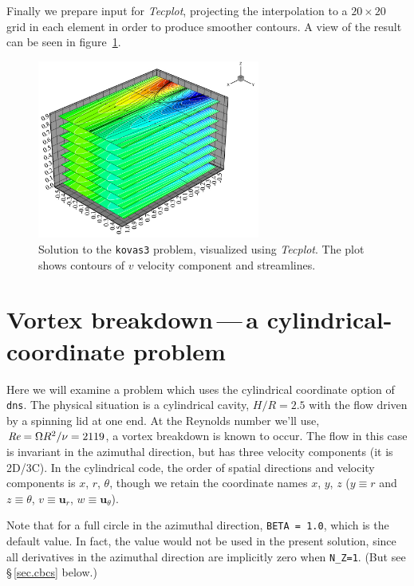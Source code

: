 \documentclass[11pt]{report}
\def\Rey{\mbox{\it Re}}                             %
\newcommand{\Tecplot}{\emph{Tecplot}}
\begin{document}
Finally we prepare input for \Tecplot, projecting the
interpolation to a $20\times20$ grid in each element in order to
produce smoother contours.  A view of the result can be seen in
figure~\ref{kov3soln}.
\begin{figure}
\begin{center}
\includegraphics[width=0.65\textwidth]{kovas3_bitmap}
\end{center}
\caption{
\label{kov3soln}
  Solution to the \texttt{kovas3} problem, visualized using
  \Tecplot.  The plot shows contours of $v$ velocity component
  and streamlines.  }
\end{figure}

\section{Vortex breakdown\,---\,a cylindrical-coordinate problem}
\label{sec.vb}

Here we will examine a problem which uses the cylindrical coordinate
option of \verb+dns+.  The physical situation is a cylindrical cavity,
$H/R=2.5$ with the flow driven by a spinning lid at one end.  At the
Reynolds number we'll use, $\Rey=\Omega R^2/\nu=2119$, a vortex
breakdown is known to occur.  The flow in this case is invariant in
the azimuthal direction, but has three velocity components (it is
2D/3C).  In the cylindrical code, the order of spatial directions and
velocity components is $x$, $r$, $\theta$, though we retain the
coordinate names $x$, $y$, $z$ (\ie $y\equiv r$ and $z\equiv\theta$,
$v\equiv\bm{u}_r$, $w\equiv\bm{u}_\theta$).

Note that for a full circle in the azimuthal direction, \texttt{BETA =
  1.0}, which is the default value. In fact, the value would not be
used in the present solution, since all derivatives in the azimuthal
direction are implicitly zero when \verb+N_Z=1+. (But see
\S\,\ref{sec.cbcs} below.)
\end{document}
